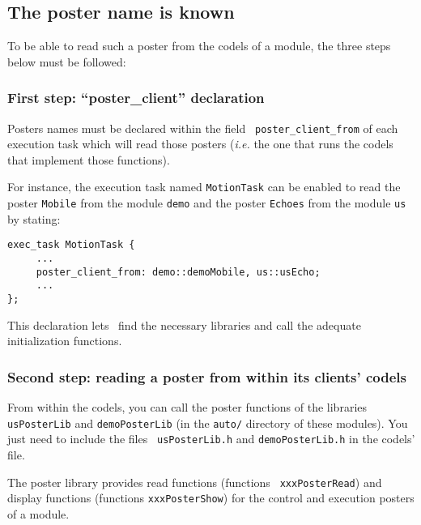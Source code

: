 \subsection{The poster name is known}

To be able to read such  a poster from the  codels of a module, the three
steps below must be followed:

\subsubsection{First step: ``poster\_client'' declaration}

Posters  names    must     be    declared   within    the      field {\tt
poster\_client\_from}   of each execution   task  which  will read  those
posters ({\em i.e.}  the one that runs   the codels that implement  those
functions).

For instance, the execution task named {\tt MotionTask} can be enabled to
read the poster  {\tt Mobile} from the  module {\tt demo} and  the poster
{\tt Echoes} from the module {\tt us} by stating:

\begin{center}\begin{cartouche}\small\begin{verbatim}
exec_task MotionTask {
     ...
     poster_client_from: demo::demoMobile, us::usEcho;
     ...
};
\end{verbatim}\end{cartouche}\end{center}

This declaration lets  \GenoM\ find the necessary  libraries and call the
adequate  initialization functions.


\subsubsection{Second step: reading a poster from within its clients'
codels}

From  within the  codels,   you can call  the  poster  functions   of the
libraries {\tt usPosterLib} and {\tt  demoPosterLib} (in the {\tt  auto/}
directory of  these modules).  You just  need to include  the  files {\tt
usPosterLib.h} and {\tt demoPosterLib.h} in the codels' file.

The  poster    library   provides   read   functions     (functions  {\tt
xxxPosterRead}) and display functions (functions {\tt xxxPosterShow}) for
the control and execution posters of a module.

